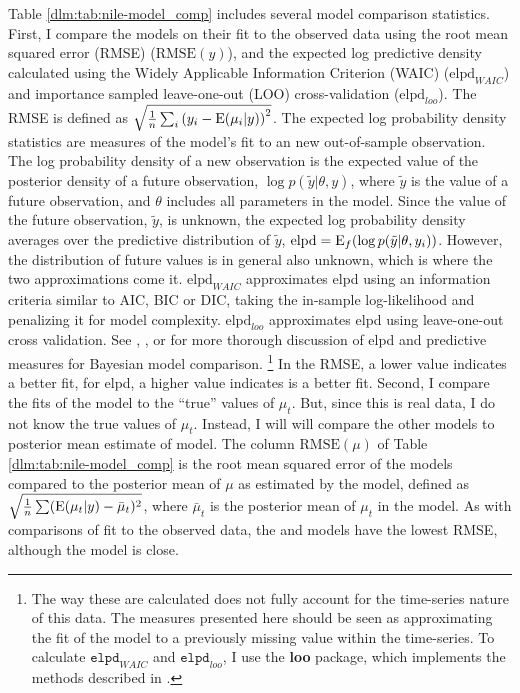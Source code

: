 Table \ref{dlm:tab:nile-model_comp} includes several model comparison statistics.
First, I compare the models on their fit to the observed data using the root mean squared error (RMSE) ($\mathrm{RMSE}(y)$), and the expected log predictive density calculated using the Widely Applicable Information Criterion (WAIC) ($\mathrm{elpd}_{WAIC}$) and importance sampled leave-one-out (LOO) cross-validation ($\mathrm{elpd}_{loo}$).
The RMSE is defined as $\sqrt{\frac{1}{n} \sum_{i} {(y_{i} - \operatorname{E}(\mu_{i} | y))}^{2}}$.
The expected log probability density statistics are measures of the model's fit to an new out-of-sample observation.
The log probability density of a new observation is the expected value of the posterior density of a future observation, $\log p(\tilde{y} | \theta, y)$, where $\tilde{y}$ is the value of a future observation, and $\theta$ includes all parameters in the model.
Since the value of the future observation, $\tilde{y}$, is unknown, the expected log probability density averages over the predictive distribution of $\tilde{y}$, $\mathrm{elpd} = \operatorname{E}_{f}(\log p(\tilde{y} | \theta, y_{i}))$. 
However, the distribution of future values is in general also unknown, which is where the two approximations come it. 
$\mathrm{elpd}_{WAIC}$ approximates elpd using an information criteria similar to AIC, BIC or DIC, taking the in-sample log-likelihood and penalizing it for model complexity.
$\mathrm{elpd}_{loo}$ approximates elpd using leave-one-out cross validation.
See \textcite{GelmanCarlinSternEtAl2013a}, \textcites{GelmanVehtari2014a}, or \textcites{GelmanHwangVehtari2014a} for more thorough discussion of elpd and predictive measures for Bayesian model comparison.%
\footnote{
  The way these are calculated does not fully account for the time-series nature of this data.
  The measures presented here should be seen as approximating the fit of the model to a previously missing value within the time-series.
  To calculate $\mathtt{elpd}_{WAIC}$ and $\mathtt{elpd}_{loo}$, I use the \textbf{loo} \RLang{} package, which implements the methods described in \textcite{GelmanVehtari2014a}.
}
In the RMSE, a lower value indicates a better fit, for elpd, a higher value indicates is a better fit.
Second, I compare the fits of the model to the ``true'' values of $\mu_{t}$. 
But, since this is real data, I do not know the true values of $\mu_{t}$.
Instead, I will will compare the other models to posterior mean estimate of  model. 
The column $\textrm{RMSE}(\mu)$ of Table \ref{dlm:tab:nile-model_comp} is the root mean squared error of the models compared to the posterior mean of $\mu$ as estimated by the  model, defined as $\sqrt{\frac{1}{n} \sum (\operatorname{E}(\mu_{t}| y) - \bar{\mu}_{t})^{2}}$, where $\bar{\mu}_{t}$ is the posterior mean of $\mu_{t}$ in the  model.
As with comparisons of fit to the observed data, the  and  models have the lowest RMSE, although the  model is close.


